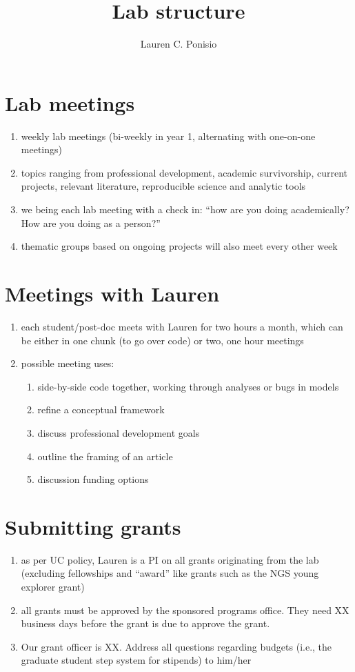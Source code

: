 \documentclass[12pt]{article}
\title{Lab structure}
\author{Lauren C. Ponisio}
\begin{document}
\maketitle

\section{Lab meetings}
\begin{enumerate}
\item weekly lab meetings (bi-weekly in year 1, alternating with
  one-on-one meetings)
\item topics ranging from professional development, academic
  survivorship, current projects, relevant literature, reproducible
  science and analytic tools
\item we being each lab meeting with a check in: ``how are you doing
  academically? How are you doing as a person?'' 
\item thematic groups based on ongoing projects will also meet every
  other week
\end{enumerate}

\section{Meetings with Lauren}
\begin{enumerate}
\item each student/post-doc meets with Lauren for two hours a month,
  which can be either in one chunk (to go over code) or two, one hour
  meetings
\item possible meeting uses:
  \begin{enumerate}
  \item side-by-side code together, working through analyses or bugs
    in models
  \item refine a conceptual framework
  \item discuss professional development goals
  \item outline the framing of an article
  \item discussion funding options
  \end{enumerate}
\end{enumerate}

\section{Submitting grants}
\begin{enumerate}
\item as per UC policy, Lauren is a PI on all grants originating from
  the lab (excluding fellowships and ``award'' like grants such as the
  NGS young explorer grant)
\item all grants must be approved by the sponsored programs
  office. They need XX business days before the grant is due to
  approve the grant. 
\item Our grant officer is XX. Address all questions regarding budgets
  (i.e., the graduate student step system for stipends) to him/her
\end{enumerate}
\end{document}
